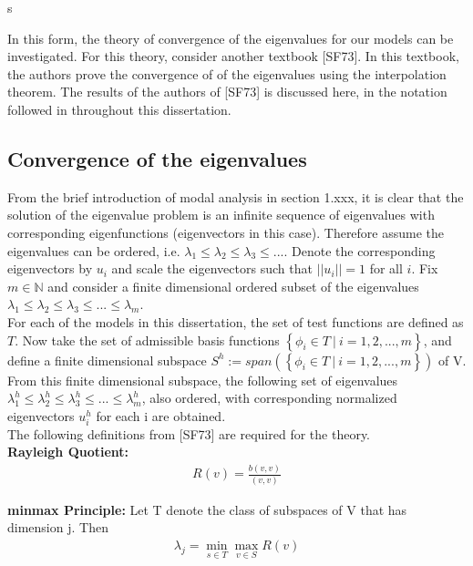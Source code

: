 s\documentclass[../../main.tex]{subfiles}
\begin{document}
In this form, the theory of convergence of the eigenvalues for our models can be investigated. For this theory, consider another textbook [SF73]. In this textbook, the authors prove the convergence of of the eigenvalues using the interpolation theorem. The results of the authors of [SF73] is discussed here, in the notation followed in throughout this dissertation.

\subsection{Convergence of the eigenvalues}
From the brief introduction of modal analysis in section 1.xxx, it is clear that the solution of the eigenvalue problem is an infinite sequence of eigenvalues with corresponding eigenfunctions (eigenvectors in this case). Therefore assume the eigenvalues can be ordered, i.e. $\lambda_{1} \leq \lambda_{2} \leq \lambda_{3} \leq ...$. Denote the corresponding eigenvectors by $u_{i}$ and scale the eigenvectors such that $||u_{i}|| = 1$ for all $i$. Fix $m\in\mathbb{N}$ and consider a finite dimensional ordered subset of the eigenvalues $\lambda_{1} \leq \lambda_{2} \leq \lambda_{3} \leq ... \leq \lambda_{m}$.\\

For each of the models in this dissertation, the set of test functions are defined as $T$. Now take the set of admissible basis functions $\left\{ \phi_{i} \in T \ | \ i = 1,2,...,m\right\}$, and define a finite dimensional subspace $S^{h} := span(\left\{\phi_{i}\in T \ | \ i = 1,2,...,m\right\})$ of V. From this finite dimensional subspace, the following set of eigenvalues $\lambda^{h}_{1} \leq \lambda^{h}_{2} \leq \lambda^{h}_{3} \leq ... \leq \lambda^{h}_{m}$, also ordered, with corresponding normalized eigenvectors $u^{h}_{i}$ for each i are obtained.\\

The following definitions from [SF73] are required for the theory.\\
\textbf{Rayleigh Quotient:}
\begin{align*}
	R(v) = \frac{b(v,v)}{( v,v )}
\end{align*}

\textbf{minmax Principle:} Let T denote the class of subspaces of V that has dimension j. Then
\begin{align*}
\lambda_{j} = \min\limits_{s\in T} \max\limits_{v\in S}R(v)
\end{align*}\\
\end{document}
